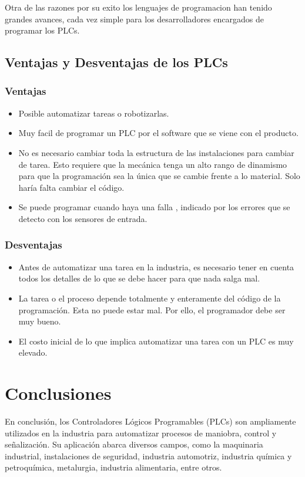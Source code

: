 \documentclass[12pt]{report}
\begin{document}
Otra de las razones por su exito los lenguajes de programacion han tenido grandes avances, cada vez simple para los desarrolladores encargados de programar los PLCs. \cite{Autycom2019}
\section{Ventajas y Desventajas de los PLCs}
\subsection{Ventajas}
\begin{itemize}
\item Posible automatizar tareas o robotizarlas.
\item Muy facil de programar un PLC por el software que se viene con el producto.
\item No es necesario cambiar toda la estructura de las instalaciones para cambiar de tarea. Esto requiere que la mecánica tenga un alto rango de dinamismo para que la programación sea la única que se cambie frente a lo material. Solo haría falta cambiar el código.
\item Se puede programar cuando haya una falla , indicado por los errores que se detecto con los sensores de entrada.
\end{itemize}


  \subsection{Desventajas}
  \begin{itemize}
  \item Antes de automatizar una tarea en la industria, es necesario tener en cuenta todos los detalles de lo que se debe hacer para que nada salga mal.
  \item La tarea o el proceso depende totalmente y enteramente del código de la programación. Esta no puede estar mal. Por ello, el programador debe ser muy bueno.
  \item El costo inicial de lo que implica automatizar una tarea con un PLC es muy elevado. \cite{VentajasDesventajasPLC}
  \end{itemize}
\newpage


\chapter{Conclusiones}
En conclusión, los Controladores Lógicos Programables (PLCs) son ampliamente utilizados en la industria para automatizar procesos de maniobra, control y señalización. Su aplicación abarca diversos campos, como la maquinaria industrial, instalaciones de seguridad, industria automotriz, industria química y petroquímica, metalurgia, industria alimentaria, entre otros.
\end{document}
